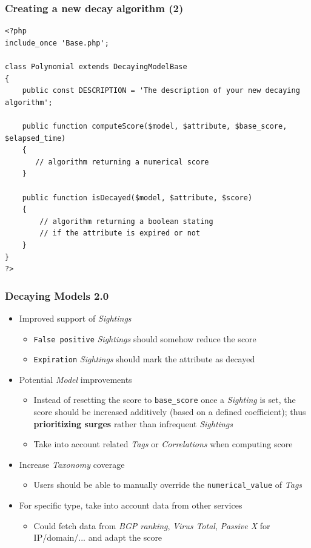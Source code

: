 \lstset{language=PHP}
\begin{frame}[fragile]
    \frametitle{Creating a new decay algorithm (2)}
    \lstset{basicstyle=\scriptsize}
    \begin{lstlisting}
<?php
include_once 'Base.php';

class Polynomial extends DecayingModelBase
{
    public const DESCRIPTION = 'The description of your new decaying algorithm';

    public function computeScore($model, $attribute, $base_score, $elapsed_time)
    {
       // algorithm returning a numerical score
    }

    public function isDecayed($model, $attribute, $score)
    {
        // algorithm returning a boolean stating
        // if the attribute is expired or not
    }
}
?>
    \end{lstlisting}
\end{frame}

\begin{frame}
    \frametitle{Decaying Models 2.0}
    \begin{itemize}
        \item Improved support of \textit{Sightings}
        \begin{itemize}
            \item \texttt{False positive} \textit{Sightings} should somehow reduce the score
            \item \texttt{Expiration} \textit{Sightings} should mark the attribute as decayed
        \end{itemize}
        \item Potential \textit{Model} improvements
        \begin{itemize}
            \item Instead of resetting the score to \texttt{base\_score} once a \textit{Sighting} is set, the score should be increased additively (based on a defined coefficient); thus \textbf{prioritizing surges} rather than infrequent \textit{Sightings}
            \item Take into account related \textit{Tags} or \textit{Correlations} when computing score
        \end{itemize}
        \item Increase \textit{Taxonomy} coverage
        \begin{itemize}
            \item Users should be able to manually override the \texttt{numerical\_value} of \textit{Tags}
        \end{itemize}
        \item For specific type, take into account data from other services
        \begin{itemize}
            \item Could fetch data from \textit{BGP ranking}, \textit{Virus Total}, \textit{Passive X} for IP/domain/... and adapt the score
        \end{itemize}
    \end{itemize}
\end{frame}
